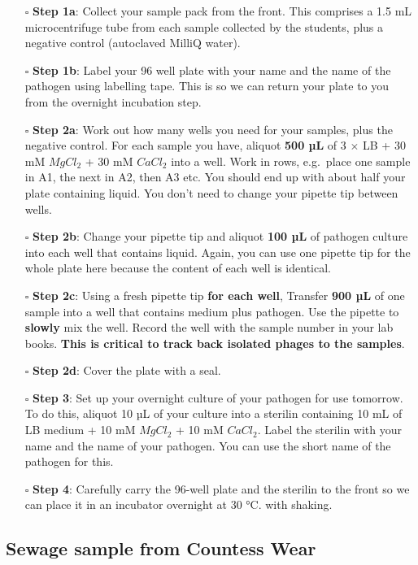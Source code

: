 \documentclass[
]{book}
\providecommand{\tightlist}{%
  \setlength{\itemsep}{0pt}\setlength{\parskip}{0pt}}
\begin{document}
\begin{itemize}
\tightlist
\item[$\square$]
  \textbf{Step 1a}: Collect your sample pack from the front. This comprises a 1.5 mL microcentrifuge tube from each sample collected by the students, plus a negative control (autoclaved MilliQ water).
\item[$\square$]
  \textbf{Step 1b}: Label your 96 well plate with your name and the name of the pathogen using labelling tape. This is so we can return your plate to you from the overnight incubation step.
\item[$\square$]
  \textbf{Step 2a}: Work out how many wells you need for your samples, plus the negative control. For each sample you have, aliquot \textbf{500 µL} of 3 \(\times\) LB + 30 mM \(MgCl_{2}\) + 30 mM \(CaCl_{2}\) into a well. Work in rows, e.g.~place one sample in A1, the next in A2, then A3 etc. You should end up with about half your plate containing liquid. You don't need to change your pipette tip between wells.
\item[$\square$]
  \textbf{Step 2b}: Change your pipette tip and aliquot \textbf{100 µL} of pathogen culture into each well that contains liquid. Again, you can use one pipette tip for the whole plate here because the content of each well is identical.
\item[$\square$]
  \textbf{Step 2c}: Using a fresh pipette tip \textbf{for each well}, Transfer \textbf{900 µL} of one sample into a well that contains medium plus pathogen. Use the pipette to \textbf{slowly} mix the well. Record the well with the sample number in your lab books. \textbf{This is critical to track back isolated phages to the samples}.
\item[$\square$]
  \textbf{Step 2d}: Cover the plate with a seal.
\item[$\square$]
  \textbf{Step 3}: Set up your overnight culture of your pathogen for use tomorrow. To do this, aliquot 10 µL of your culture into a sterilin containing 10 mL of LB medium + 10 mM \(MgCl_{2}\) + 10 mM \(CaCl_{2}\). Label the sterilin with your name and the name of your pathogen. You can use the short name of the pathogen for this.
\item[$\square$]
  \textbf{Step 4}: Carefully carry the 96-well plate and the sterilin to the front so we can place it in an incubator overnight at 30 °C. with shaking.
\end{itemize}

\hypertarget{sewage-sample-from-countess-wear}{%
\subsection{Sewage sample from Countess Wear}\label{sewage-sample-from-countess-wear}}
\end{document}

